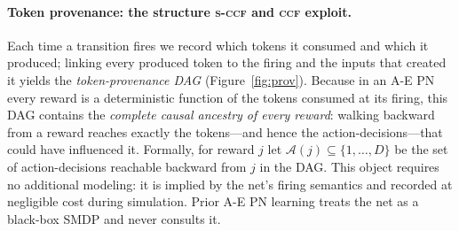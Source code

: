 \documentclass[review,authoryear,3p,times]{elsarticle}
\newcommand{\ccf}{\textsc{ccf}}
\newcommand{\sccf}{\textsc{s-ccf}}
\newcommand{\Ascr}{\mathcal{A}}
\begin{document}
\paragraph{Token provenance: the structure \sccf{} and \ccf{} exploit.} Each time
a transition fires we record which tokens it consumed and which it produced;
linking every produced token to the firing and the inputs that created it
yields the \emph{token-provenance DAG} (Figure~\ref{fig:prov}). Because in an
A-E PN every reward is a deterministic function of the tokens consumed at its
firing, this DAG contains the \emph{complete causal ancestry of every
reward}: walking backward from a reward reaches exactly the
tokens---and hence the action-decisions---that could have influenced it.
Formally, for reward $j$ let $\Ascr(j)\subseteq\{1,\dots,D\}$ be the set of
action-decisions reachable backward from $j$ in the DAG. This object requires
no additional modeling: it is implied by the net's firing semantics and
recorded at negligible cost during simulation. Prior A-E PN learning treats
the net as a black-box SMDP and never consults it.
\end{document}
